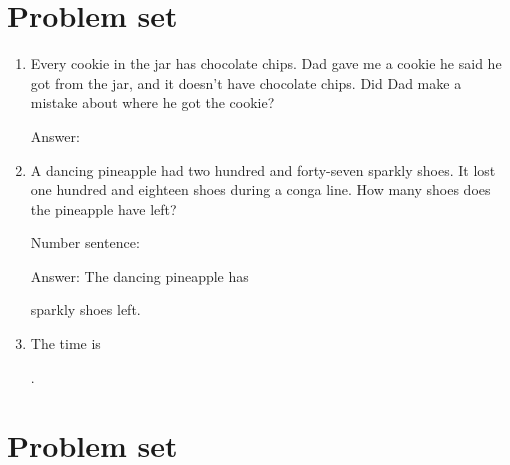 \documentclass{tufte-book}
\begin{document}
\clearpage\section{Problem set }

\begin{enumerate}

\item Every cookie in the jar has chocolate chips. Dad gave me a cookie he said he got from the jar, and it doesn't have chocolate chips.
Did Dad make a mistake about where he got the cookie?\medskip\par
Answer: \dotfill\medskip

\item A dancing pineapple had two hundred and forty-seven sparkly shoes. It lost one hundred and eighteen shoes during a conga line. How many shoes does the pineapple have left?\medskip\par
Number sentence: \dotfill\medskip\par
Answer: The dancing pineapple has 
\dotfill\medskip\par\mbox{}\dotfill\medskip\par\mbox{}\dotfill\bigskip
 sparkly shoes left.

\item {}
The time is \dotfill\medskip\par\dotfill\medskip.

\end{enumerate}

\clearpage\section{Problem set }
\end{document}
